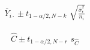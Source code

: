 \documentclass[12pt]{article}
\begin{document}
\pagestyle{empty}
\Large
{}
\pagecolor{ehandbook}

\boldmath

\begin{eqnarray*}
\overline{Y}_{i\cdot} \pm t_{1-\alpha/2, N-k} \,\,\sqrt{\frac{\hat{\sigma}^2_\epsilon}{n_i}}
\end{eqnarray*}

\vspace*{.25in}

\begin{eqnarray*}
\hat{C} \pm t_{1-\alpha/2, N-r} \,\, s_{\hat{C}}
\end{eqnarray*}
\end{document}
